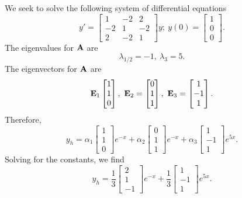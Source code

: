 \begin{example}
    We seek to solve the following system of differential equations
    $$y' = \begin{bmatrix}1 & -2 & 2 \\ -2 & 1 & -2 
        \\ 2 & -2 & 1 \end{bmatrix}y; ~ y(0) = \begin{bmatrix}1 \\ 0 \\ 0\end{bmatrix}.$$
        The eigenvalues for $\bold{A}$ are $$\lambda_{1/2} = -1,~\lambda_3 = 5.$$
        The eigenvectors for $\bold{A}$ are
        $$\bold{E}_1 \begin{bmatrix} 1 \\ 1 \\ 0\end{bmatrix},~\bold{E}_2 = 
        \begin{bmatrix} 0 \\ 1 \\ 1\end{bmatrix},~\bold{E}_3 = 
        \begin{bmatrix}1 \\ -1 \\ 1 \end{bmatrix}.$$
        Therefore, 
        $$y_h =\alpha_1 \begin{bmatrix} 1 \\ 1 \\ 0\end{bmatrix}e^{-x}
              +\alpha_2 \begin{bmatrix} 0 \\ 1 \\ 1\end{bmatrix} e^{-x}
              +\alpha_3 \begin{bmatrix}1 \\ -1 \\ 1 \end{bmatrix}e^{5x}.$$
        Solving for the constants, we find
        $$y_h = \frac{1}{3} \begin{bmatrix} 2 \\ 1 \\ -1\end{bmatrix}e^{-x}
        +\frac{1}{3} \begin{bmatrix}1 \\ -1 \\ 1 \end{bmatrix}e^{5x}.$$
\end{example}

